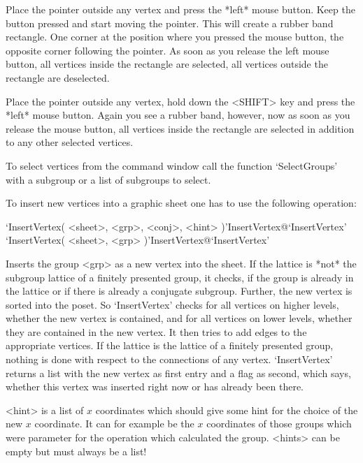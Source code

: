 Place the pointer  outside any vertex  and press the *left* mouse button.
Keep the button pressed and start moving the pointer.  This will create a
rubber band rectangle.  One corner at the position  where you pressed the
mouse button, the opposite corner following  the pointer.  As soon as you
release the left mouse button,   all  vertices inside the rectangle   are
selected, all vertices outside the rectangle are deselected.

Place the pointer outside any vertex, hold down the <SHIFT> key and press
the *left*  mouse button.  Again  you see a rubber  band, however, now as
soon as you release  the mouse button,  all vertices inside the rectangle
are selected in addition to any other selected vertices.

To select vertices from the {\GAP} command window call the function
`SelectGroups' with a subgroup or a list of subgroups to select.



To insert new vertices into a graphic sheet one has to use the
following operation:

\>`InsertVertex( <sheet>, <grp>, <conj>, <hint> )'{InsertVertex}@{`InsertVertex'} 
\>`InsertVertex( <sheet>, <grp> )'{InsertVertex}@{`InsertVertex'} 

Inserts the group <grp> as a new vertex into the sheet. If the lattice
is *not*  the   subgroup lattice  of a  finitely  presented  group, it
checks, if the group is already in the lattice  or if there is already
a conjugate  subgroup.  Further,  the new  vertex is  sorted into  the
poset. So  `InsertVertex'  checks for  all vertices  on higher levels,
whether the new vertex  is contained,  and  for all vertices on  lower
levels, whether they are contained in the new vertex. It then tries to
add edges to the appropriate vertices.  If  the lattice is the lattice
of a  finitely presented group,  nothing is  done with respect  to the
connections of any vertex.  `InsertVertex' returns a list with the new
vertex as first entry and  a flag as  second, which says, whether this
vertex was inserted right now or has already  been there.  

<hint> is a list of $x$ coordinates which should give some hint for
the choice of the new $x$ coordinate. It can for example be the $x$
coordinates of those groups which were parameter for the operation
which calculated the group. <hints> can be empty but must always be a
list!

